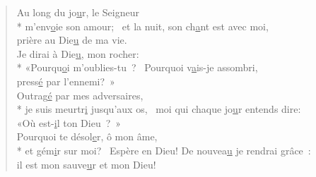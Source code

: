 \begin{verse}
Au long du jo\underline{u}r, le Seigneur \\*
m’env\underline{o}ie son amour;~\psalmstar
et la nuit, son ch\underline{a}nt est avec moi, \\
prière au Die\underline{u} de ma vie. \\

Je dirai à Die\underline{u}, mon rocher: \\*
«Pourqu\underline{o}i m’oublies-tu ?~\psalmstar
Pourquoi v\underline{a}is-je assombri, \\
press\underline{é} par l’ennemi? » \\

Outrag\underline{é} par mes adversaires, \\*
je suis meurtr\underline{i} jusqu’aux os,~\psalmstar
moi qui chaque jo\underline{u}r entends dire: \\
«Où est-\underline{i}l ton Dieu ? » \\

Pourquoi te désol\underline{e}r, ô mon âme, \\*
et gém\underline{i}r sur moi?~\psalmstar
Espère en Dieu! De nouvea\underline{u} je rendrai grâce : \\
il est mon sauve\underline{u}r et mon Dieu! \\
\end{verse}

